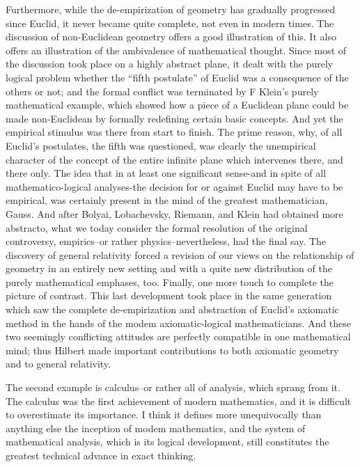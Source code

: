 \documentclass{article}
\begin{document}
Furthermore, while the de-empirization of geometry has gradually progressed since Euclid, it never became quite complete, not even in modern times. The discussion of non-Euclidean geometry offers a good illustration of this. It also offers an illustration of the ambivalence of mathematical thought. Since most of the discussion took place on a highly abstract plane, it dealt with the purely logical problem whether the ``fifth postulate'' of Euclid was a consequence of the others or not; and the formal conflict was terminated by F Klein's purely mathematical example, which showed how a piece of a Euclidean plane could be made non-Euclidean by formally redefining certain basic concepts. And yet the empirical stimulus was there from start to finish. The prime reason, why, of all Euclid's postulates, the fifth was questioned, was clearly the unempirical character of the concept of the entire infinite plane which intervenes there, and there only. The idea that in at least one significant sense-and in spite of all mathematico-logical analyses-the decision for or against Euclid may have to be empirical, was certainly present in the mind of the greatest mathematician, Gauss. And after Bolyai, Lobachevsky, Riemann, and Klein had obtained more abstracto, what we today consider the formal resolution of the original controversy, empirics--or rather physics--nevertheless, had the final say. The discovery of general relativity forced a revision of our views on the relationship of geometry in an entirely new setting and with a quite new distribution of the purely mathematical emphases, too. Finally, one more touch to complete the picture of contrast. This last development took place in the same generation which saw the complete de-empirization and abstraction of Euclid's axiomatic method in the hands of the modem axiomatic-logical mathematicians. And these two seemingly conflicting attitudes are perfectly compatible in one mathematical mind; thus Hilbert made important contributions to both axiomatic geometry and to general relativity.

The second example is calculus--or rather all of analysis, which sprang from it. The calculus was the first achievement of modern mathematics, and it is difficult to overestimate its importance. I think it defines more unequivocally than anything else the inception of modem mathematics, and the system of mathematical analysis, which is its logical development, still constitutes the greatest technical advance in exact thinking.
\end{document}
